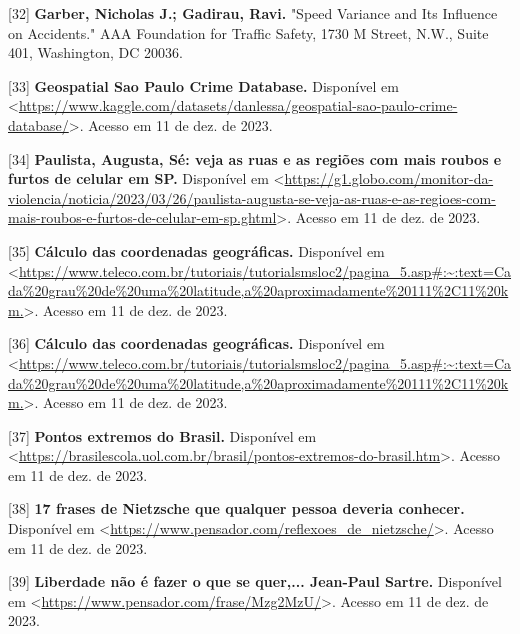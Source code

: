 [32] \textbf{Garber, Nicholas J.; Gadirau, Ravi.} "Speed Variance and Its Influence on Accidents." AAA Foundation for Traffic Safety, 1730 M Street, N.W., Suite 401, Washington, DC 20036.

[33] \textbf{Geospatial Sao Paulo Crime Database.} Disponível em <\url{https://www.kaggle.com/datasets/danlessa/geospatial-sao-paulo-crime-database/}>. Acesso em 11 de dez. de 2023.

[34] \textbf{Paulista, Augusta, Sé: veja as ruas e as regiões com mais roubos e furtos de celular em SP.} Disponível em <\url{https://g1.globo.com/monitor-da-violencia/noticia/2023/03/26/paulista-augusta-se-veja-as-ruas-e-as-regioes-com-mais-roubos-e-furtos-de-celular-em-sp.ghtml}>. Acesso em 11 de dez. de 2023.

[35] \textbf{Cálculo das coordenadas geográficas.} Disponível em <\url{https://www.teleco.com.br/tutoriais/tutorialsmsloc2/pagina_5.asp#:~:text=Cada%20grau%20de%20uma%20latitude,a%20aproximadamente%20111%2C11%20km.}>. Acesso em 11 de dez. de 2023.


[36] \textbf{Cálculo das coordenadas geográficas.} Disponível em <\url{https://www.teleco.com.br/tutoriais/tutorialsmsloc2/pagina_5.asp#:~:text=Cada%20grau%20de%20uma%20latitude,a%20aproximadamente%20111%2C11%20km.}>. Acesso em 11 de dez. de 2023.


[37] \textbf{Pontos extremos do Brasil.} Disponível em <\url{https://brasilescola.uol.com.br/brasil/pontos-extremos-do-brasil.htm}>. Acesso em 11 de dez. de 2023.

[38] \textbf{17 frases de Nietzsche que qualquer pessoa deveria conhecer.} Disponível em <\url{https://www.pensador.com/reflexoes_de_nietzsche/}>. Acesso em 11 de dez. de 2023.


[39] \textbf{Liberdade não é fazer o que se quer,... Jean-Paul Sartre.} Disponível em <\url{https://www.pensador.com/frase/Mzg2MzU/}>. Acesso em 11 de dez. de 2023.




